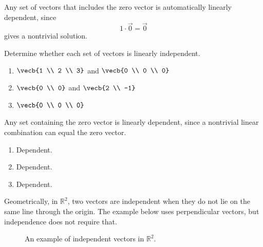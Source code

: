 Any set of vectors that includes the zero vector is automatically linearly dependent, since
$$1 \cdot \vec{0} = \vec{0}$$
gives a nontrivial solution.
\begin{Exercise}[title = Zero Vector and Dependence, label = indep2]
Determine whether each set of vectors is linearly independent.
\begin{enumerate}
\item $\vecb{1 \\ 2 \\ 3}$ and $\vecb{0 \\ 0 \\ 0}$
\item $\vecb{0 \\ 0}$ and $\vecb{2 \\ -1}$
\item $\vecb{0 \\ 0 \\ 0}$
\end{enumerate}
\end{Exercise}
\begin{Answer}[ref = indep2]
Any set containing the zero vector is linearly dependent, since a nontrivial
linear combination can equal the zero vector.
\begin{enumerate}
\item Dependent.
\item Dependent.
\item Dependent.
\end{enumerate}
\end{Answer}

Geometrically, in $\mathbb{R}^2$, two vectors are independent when they do not lie on the same line through the origin. The example below uses perpendicular vectors, but independence does not require that.

\begin{figure}[H]
    \centering
    \caption{An example of independent vectors in $\mathbb{R}^2$.}
    \label{fig:example-dependence}
\end{figure}

